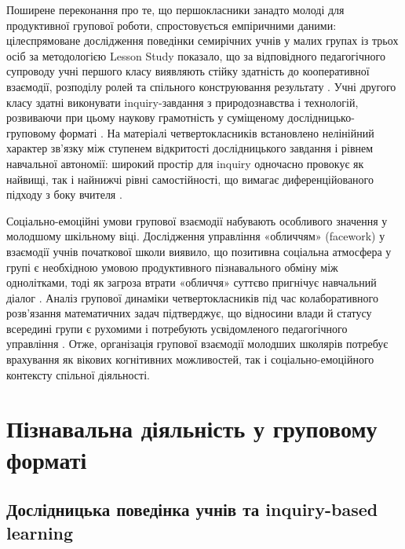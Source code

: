 \documentclass[a4paper,12pt]{article}
\begin{document}
Поширене переконання про те, що першокласники занадто молоді для продуктивної групової роботи, спростовується емпіричними даними: цілеспрямоване дослідження поведінки семирічних учнів у малих групах із трьох осіб за методологією Lesson Study показало, що за відповідного педагогічного супроводу учні першого класу виявляють стійку здатність до кооперативної взаємодії, розподілу ролей та спільного конструювання результату \parencite{Jakavonytė-Staškuvienė2025}. Учні другого класу здатні виконувати inquiry-завдання з природознавства і технологій, розвиваючи при цьому наукову грамотність у суміщеному дослідницько-груповому форматі \parencite{Zuñiga-Quispe2025365}. На матеріалі четвертокласників встановлено нелінійний характер зв'язку між ступенем відкритості дослідницького завдання і рівнем навчальної автономії: широкий простір для inquiry одночасно провокує як найвищі, так і найнижчі рівні самостійності, що вимагає диференційованого підходу з боку вчителя \parencite{Aminga2026}.

Соціально-емоційні умови групової взаємодії набувають особливого значення у молодшому шкільному віці. Дослідження управління «обличчям» (facework) у взаємодії учнів початкової школи виявило, що позитивна соціальна атмосфера у групі є необхідною умовою продуктивного пізнавального обміну між однолітками, тоді як загроза втрати «обличчя» суттєво пригнічує навчальний діалог \parencite{Evnitskaya2021169}. Аналіз групової динаміки четвертокласників під час колаборативного розв'язання математичних задач підтверджує, що відносини влади й статусу всередині групи є рухомими і потребують усвідомленого педагогічного управління \parencite{Langer-Osuna2020514}. Отже, організація групової взаємодії молодших школярів потребує врахування як вікових когнітивних можливостей, так і соціально-емоційного контексту спільної діяльності.

\newpage


\section{Пізнавальна діяльність у груповому форматі}

\subsection{Дослідницька поведінка учнів та inquiry-based learning}
\end{document}
